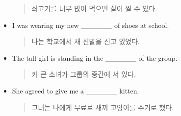 \documentclass{article}
\begin{document}
\begin{addmargin}[1em]{1em}
\begin{itemize}
    \begin{quote}
    쇠고기를 너무 많이 먹으면 살이 찔 수 있다.
    \end{quote}
    \item I was wearing my new \_\_\_\_\_\_ of shoes at school.
    \begin{quote}
    나는 학교에서 새 신발을 신고 있었다.
    \end{quote}
    \item The tall girl is standing in the \_\_\_\_\_\_ of the group.
    \begin{quote}
    키 큰 소녀가 그룹의 중간에 서 있다.
    \end{quote}
    \item She agreed to give me a \_\_\_\_\_\_ kitten.
    \begin{quote}
    그녀는 나에게 무료로 새끼 고양이를 주기로 했다.
    \end{quote}
\end{itemize}
\end{addmargin}
\end{document}
